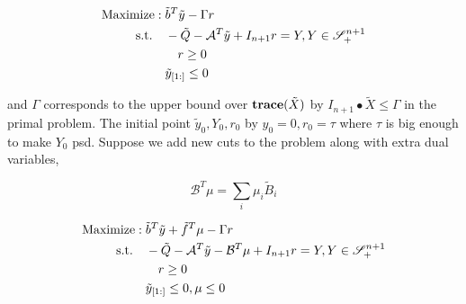 \documentclass[../main]{subfiles}
\begin{document}
\begin{equation} \label{eq:ws.dsdp.dual}
    \begin{aligned}
        \mathrm{Maximize:\;}           & \tilde b^T \tilde y-\Gamma r                                              \\
        \mathrm{s.t.} \quad & - \tilde{Q}-\mathcal{A}^T \tilde y+I_{n+1} r= Y, Y \in \mathscr S^{n+1}_+ \\
                            & \quad r \ge 0                                                             \\
                            & \tilde y_{[1:]} \le 0
    \end{aligned}
\end{equation}

and \(\Gamma\) corresponds to the upper bound over \(\mathbf{trace}(\tilde X)\) by \(I_{n+1} \bullet \tilde X \le \Gamma\) in the primal problem. The initial point \(\tilde y_0, Y_0, r_0\) by \(y_0 = 0, r_0 = \tau\) where \(\tau\) is big enough to make \(Y_0\) psd.
Suppose we add new cuts to the problem along with extra dual variables,

\begin{equation}
    \mathcal B^T\mu = \sum_i \mu_i \tilde B_i
\end{equation}

\begin{equation}
    \begin{aligned}
        \mathrm{Maximize:\;}           & \tilde b^T \tilde y + \tilde f^T \mu-\Gamma r                                                 \\
        \mathrm{s.t.} \quad & - \tilde{Q}-\mathcal{A}^T \tilde y - \mathcal{B}^T\mu +I_{n+1} r= Y, Y \in \mathscr S^{n+1}_+ \\
                            & \quad r \ge 0                                                                                 \\
                            & \tilde y_{[1:]} \le 0, \mu \le 0
    \end{aligned}
\end{equation}
\end{document}
